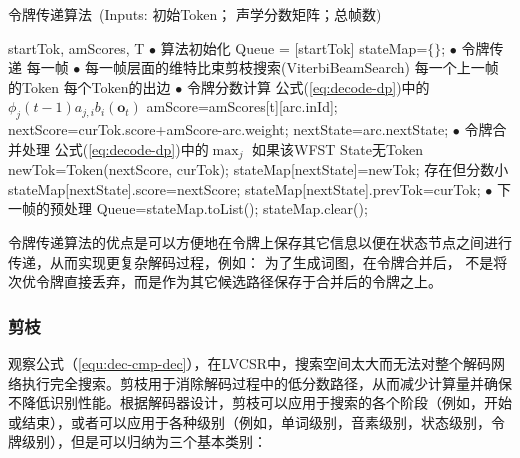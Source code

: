 \begin{algorithm}[ht]
\caption{令牌传递算法\ {(Inputs:  \textcolor[rgb]{0,0.5,0}{初始Token； 声学分数矩阵；总帧数})}}
\label{code:tokpass}
\begin{algorithmic}[1]
 {startTok, amScores, T}
\State    $\bullet$ \textrm{算法初始化}
\State Queue = [startTok]
\State stateMap=$\{\}$;
\State    $\bullet$ \textrm{令牌传递}
 \Comment \textcolor[rgb]{0,0.5,0}{每一帧}
\State    $\bullet$ \textrm{每一帧层面的维特比束剪枝搜索(ViterbiBeamSearch)}
 \Comment \textcolor[rgb]{0,0.5,0}{每一个上一帧的Token}
  \Comment \textcolor[rgb]{0,0.5,0}{每个Token的出边}
\State    $\bullet$ \textrm{令牌分数计算} \Comment \textcolor[rgb]{0,0.5,0}{公式(\ref{eq:decode-dp})中的$\phi_j(t-1)a_{j,i}b_i(\mathbf{o}_t)$}
\State amScore=amScores[t][arc.inId];
\State nextScore=curTok.score+amScore-arc.weight;
\State nextState=arc.nextState;
\State    $\bullet$ \textrm{令牌合并处理} \Comment \textcolor[rgb]{0,0.5,0}{公式(\ref{eq:decode-dp})中的$\max_j$}
  \Comment \textcolor[rgb]{0,0.5,0}{如果该WFST State无Token}
\State newTok=Token(nextScore, curTok);
\State stateMap[nextState]=newTok;
\EndIf
{}   \Comment \textcolor[rgb]{0,0.5,0}{存在但分数小}
\State stateMap[nextState].score=nextScore;
\State stateMap[nextState].prevTok=curTok;
\EndIf
\EndFor
\EndFor
\State $\bullet$ \textrm{下一帧的预处理}
\State Queue=stateMap.toList();
\State stateMap.clear();
\EndFor
\EndProcedure
\end{algorithmic}
\end{algorithm}

令牌传递算法的优点是可以方便地在令牌上保存其它信息以便在状态节点之间进行传递，从而实现更复杂解码过程，例如： 为了生成词图，在令牌合并后， 不是将次优令牌直接丢弃，而是作为其它候选路径保存于合并后的令牌之上。

\subsubsection{剪枝}

观察公式（\ref{equ:dec-cmp-dec}），在LVCSR中，搜索空间太大而无法对整个解码网络执行完全搜索。剪枝用于消除解码过程中的低分数路径，从而减少计算量并确保不降低识别性能。根据解码器设计，剪枝可以应用于搜索的各个阶段（例如，开始或结束），或者可以应用于各种级别（例如，单词级别，音素级别，状态级别，令牌级别），但是可以归纳为三个基本类别：

